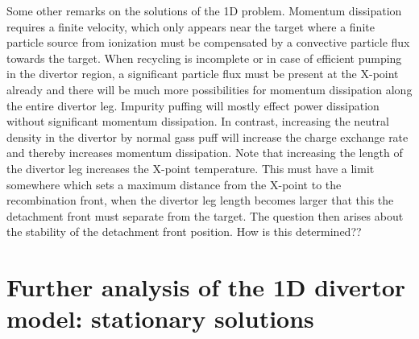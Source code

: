 \documentclass[amsmath,amssymb,a4]{revtex4}
\begin{document}
Some other remarks on the solutions of the 1D problem. Momentum dissipation requires a finite velocity, which only appears near the target where a finite particle source from ionization must be compensated by a convective particle flux towards the target. When recycling is incomplete or in case of efficient pumping in the divertor region, a significant particle flux must be present at the X-point already and there will be much more possibilities for momentum dissipation along the entire divertor leg. Impurity puffing will mostly effect power dissipation without significant momentum dissipation. In contrast, increasing the neutral density in the divertor by normal gass puff will increase the charge exchange rate and thereby increases momentum dissipation. Note that increasing the length of the divertor leg increases the X-point temperature. This must have a limit somewhere which sets a maximum distance from the X-point to the recombination front, when the divertor leg length becomes larger that this the detachment front must separate from the target. The question then arises about the stability of the detachment front position. How is this determined??


\section{Further analysis of the 1D divertor model: stationary solutions}
\end{document}
